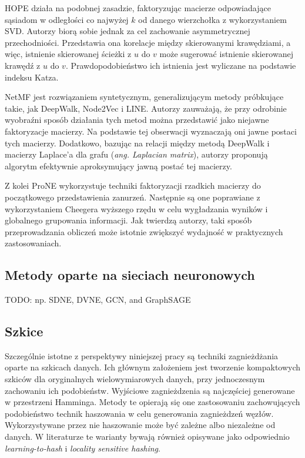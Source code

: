         HOPE\cite{Ou_Cui_Pei_Zhang_Zhu_2016} działa na podobnej zasadzie, faktoryzując macierze odpowiadające sąsiadom w odległości co najwyżej $k$ od danego wierzchołka z wykorzystaniem SVD. Autorzy biorą sobie jednak za cel zachowanie asymmetrycznej przechodniości. Przedstawia ona korelacje między skierowanymi krawędziami, a więc, istnienie skierowanej ścieżki z $u$ do $v$ może sugerować istnienie skierowanej krawędź z $u$ do $v$.  Prawdopodobieństwo ich istnienia jest wyliczane na podstawie indeksu Katza\cite{Katz_1953}. 
        
        NetMF\cite{Qiu_Dong_Ma_Li_Wang_Tang_2018} jest rozwiązaniem syntetycznym, generalizującym  metody próbkujące takie, jak DeepWalk, Node2Vec i LINE. Autorzy zauważają, że przy odrobinie wyobraźni sposób działania tych metod można przedstawić jako niejawne faktoryzacje macierzy. Na podstawie tej obserwacji wyznaczają oni jawne postaci tych macierzy. Dodatkowo, bazując na relacji między metodą DeepWalk i macierzy Laplace'a dla grafu (\emph{ang. Laplacian matrix}), autorzy proponują algorytm efektywnie aproksymujący jawną postać tej macierzy.
        
        Z kolei ProNE\cite{Zhang_Dong_Wang_Tang_Ding_2019} wykorzystuje techniki faktoryzacji rzadkich macierzy do początkowego przedstawienia zanurzeń. Następnie są one poprawiane z wykorzystaniem Cheegera wyższego rzędu w celu wygładzania wyników i globalnego grupowania informacji. Jak twierdzą autorzy, taki sposób przeprowadzania obliczeń może istotnie zwiększyć wydajność w praktycznych zastosowaniach.

    \subsection{Metody oparte na sieciach neuronowych}
        TODO: np. SDNE\cite{Wang_Cui_Zhu_2016}, DVNE\cite{Zhu_Cui_Wang_Zhu_2018}, GCN\cite{DBLP:journals/corr/KipfW16}, and GraphSAGE\cite{DBLP:journals/corr/HamiltonYL17} 

    \subsection{Szkice}
        Szczególnie istotne z perspektywy niniejszej pracy są techniki zagnieżdżania oparte na szkicach danych. Ich głównym założeniem jest tworzenie kompaktowych szkiców dla oryginalnych wielowymiarowych danych, przy jednoczesnym zachowaniu ich podobieństw. Wyjściowe zagnieżdzenia są najczęściej generowane w przestrzeni Hamminga. Metody te opierają się one zastosowaniu zachowujących podobieństwo technik haszowania w celu generowania zagnieżdzeń węzłów. Wykorzystywane przez nie haszowanie może być zależne albo niezależne od danych. W literaturze te warianty bywają również opisywane jako odpowiednio \emph{learning-to-hash} i \emph{locality sensitive hashing}\cite{wang2017survey}.  

